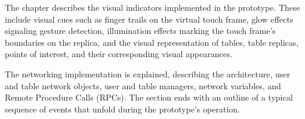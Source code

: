     The chapter describes the visual indicators implemented in the prototype. These include visual cues such as finger trails on the virtual touch frame, glow effects signaling gesture detection, illumination effects marking the touch frame's boundaries on the replica, and the visual representation of tables, table replicas, points of interest, and their corresponding visual appearances.

    The networking implementation is explained, describing the architecture, user and table network objects, user and table managers, network variables, and Remote Procedure Calls (RPCs). The section ends with an outline of a typical sequence of events that unfold during the prototype's operation.
